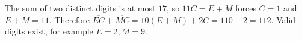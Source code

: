 The sum of two distinct digits is at most $17$, so $11C=E+M$ forces $C=1$ and $E+M=11$. Therefore $\overline{EC}+\overline{MC}=10(E+M)+2C=110+2=\boxed{112}$. Valid digits exist, for example $E=2,M=9$.
